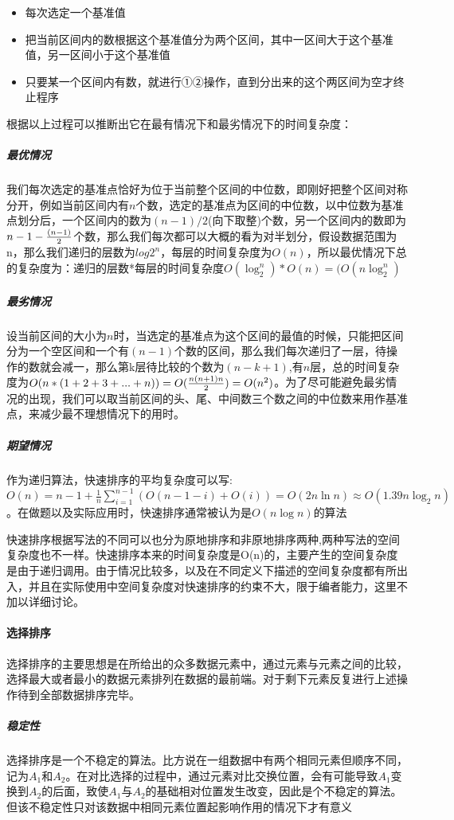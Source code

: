 \documentclass[UTF8]{ctexart}
\begin{document}
\begin{itemize}
	\item 每次选定一个基准值
	\item 把当前区间内的数根据这个基准值分为两个区间，其中一区间大于这个基准值，另一区间小于这个基准值
	\item 只要某一个区间内有数，就进行①②操作，直到分出来的这个两区间为空才终止程序
\end{itemize}

根据以上过程可以推断出它在最有情况下和最劣情况下的时间复杂度：
\subparagraph{最优情况}
我们每次选定的基准点恰好为位于当前整个区间的中位数，即刚好把整个区间对称分开，例如当前区间内有$n$个数，选定的基准点为区间的中位数，以中位数为基准点划分后，一个区间内的数为$(n-1)/2$(向下取整)个数，另一个区间内的数即为$n - 1 - {(n-1) \over 2}$个数，那么我们每次都可以大概的看为对半划分，假设数据范围为n，那么我们递归的层数为$log2^n$，每层的时间复杂度为$O(n)$，所以最优情况下总的复杂度为：递归的层数*每层的时间复杂度$O(\log_2^n)*O(n)=(O(n \log_2^n)$

\subparagraph{最劣情况}
设当前区间的大小为$n$时，当选定的基准点为这个区间的最值的时候，只能把区间分为一个空区间和一个有$(n-1)$个数的区间，那么我们每次递归了一层，待操作的数就会减一，那么第k层待比较的个数为$(n-k+1)$,有$n$层，总的时间复杂度为$O(n*(1+2+3+...+n))=O({n (n+1) n \over 2})=O(n^2)$。为了尽可能避免最劣情况的出现，我们可以取当前区间的头、尾、中间数三个数之间的中位数来用作基准点，来减少最不理想情况下的用时。

\subparagraph{期望情况}
作为递归算法，快速排序的平均复杂度可以写:$O(n)=n-1+\frac{1}{n}\sum_{i=1}^{n-1}(O(n-1-i)+O(i))=O(2n\ln{n}) \approx O(1.39 n \log_2 n)$。在做题以及实际应用时，快速排序通常被认为是$O(n \log{n})$的算法

快速排序根据写法的不同可以也分为原地排序和非原地排序两种,两种写法的空间复杂度也不一样。快速排序本来的时间复杂度是O(n)的，主要产生的空间复杂度是由于递归调用。由于情况比较多，以及在不同定义下描述的空间复杂度都有所出入，并且在实际使用中空间复杂度对快速排序的约束不大，限于编者能力，这里不加以详细讨论。

\paragraph{选择排序}
选择排序\cite{cormen1990introduction}的主要思想是在所给出的众多数据元素中，通过元素与元素之间的比较，选择最大或者最小的数据元素排列在数据的最前端。对于剩下元素反复进行上述操作待到全部数据排序完毕。

\subparagraph{稳定性}
选择排序是一个不稳定的算法。比方说在一组数据中有两个相同元素但顺序不同，记为$A_1$和$A_2$。在对比选择的过程中，通过元素对比交换位置，会有可能导致$A_1$变换到$A_2$的后面，致使$A_1$与$A_2$的基础相对位置发生改变，因此是个不稳定的算法。但该不稳定性只对该数据中相同元素位置起影响作用的情况下才有意义
\end{document}
